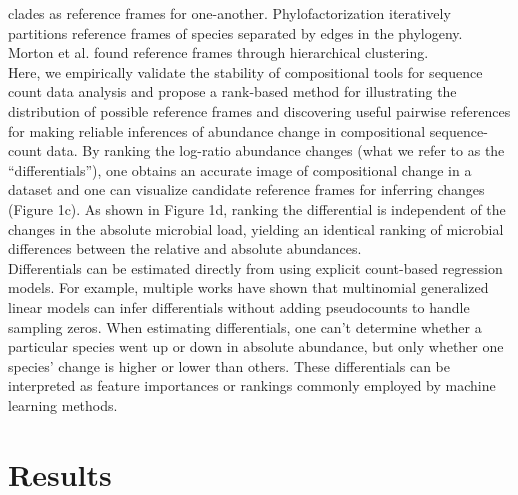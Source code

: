 clades as reference frames for one-another. Phylofactorization\cite{Washburne2017-up} iteratively
partitions reference frames of species separated by edges in the phylogeny. Morton et al.
\cite{Morton2017-dz} found reference frames through hierarchical clustering.\\[5 mm]
%
Here, we empirically validate the stability of compositional tools for sequence count data analysis and
propose a rank-based method for illustrating the distribution of possible reference frames and discovering
useful pairwise references for making reliable inferences of abundance change in compositional sequence-count
data. By ranking the log-ratio abundance changes (what we refer to as the “differentials”), one obtains an
accurate image of compositional change in a dataset and one can visualize candidate reference frames for
inferring changes (Figure 1c). As shown in Figure 1d, ranking the differential is independent of the
changes in the absolute microbial load, yielding an identical ranking of microbial differences between the
relative and absolute abundances.\\[5 mm]
%
Differentials can be estimated directly from using explicit count-based regression models. For example,
multiple works \cite{Silverman2018-ql,Aijo2018-jp, Grantham2017-gv,Xia2013-nd} have shown that multinomial
generalized linear models can infer differentials without adding pseudocounts to handle sampling zeros.
When estimating differentials, one can't determine whether a particular species went up or down in absolute
abundance, but only whether one species' change is higher or lower than others. These differentials can be
interpreted as feature importances or rankings commonly employed by machine learning methods.\\[5 mm]
\section{Results}
